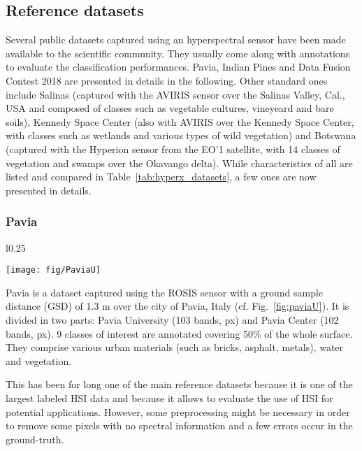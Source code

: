 \documentclass[journal]{IEEEtran}
\begin{document}
\subsection{Reference datasets}
\label{sec:datasets}







Several public datasets captured using an hyperspectral sensor have been made available to the scientific community. They usually come along with annotations to evaluate the classification performances. Pavia, Indian Pines and Data Fusion Contest 2018 are presented in details in the following. Other standard ones include Salinas (captured with the AVIRIS sensor over the Salinas Valley, Cal., USA and composed of classes such as vegetable cultures, vineyeard and bare soils), Kennedy Space Center (also with AVIRIS over the Kennedy Space Center, with classes such as wetlands and various types of wild vegetation) and Botswana (captured with the Hyperion sensor from the EO'1 satellite, with 14 classes of vegetation and swamps over the Okavango delta). While characteristics of all are listed and compared in Table~\ref{tab:hyperx_datasets}, a few ones are now presented in details.


\subsubsection{Pavia}

\begin{wrapfigure}{l}{0.25\textwidth}
  \vspace{-1em}
  \begin{center}
    \texttt{[image: fig/PaviaU]}
  \end{center}
  \vspace{-1em}
  \caption{Pavia University (natural composite image). \label{fig:paviaU}}
  \vspace{-1em}
\end{wrapfigure}

Pavia is a dataset captured using the ROSIS sensor with a ground sample distance (GSD) of 1.3 m over the city of Pavia, Italy (cf. Fig.~\ref{fig:paviaU}). It is divided in two parts: Pavia University (103 bands, px) and Pavia Center (102 bands, px). 9 classes of interest are annotated covering 50\% of the whole surface. They comprise various urban materials (such as bricks, asphalt, metals), water and vegetation.

This has been for long one of the main reference datasets because it is one of the largest labeled HSI data and because it allows to evaluate the use of HSI for potential applications. However, some preprocessing might be necessary in order to remove some pixels with no spectral information and a few errors occur in the ground-truth.
\end{document}
